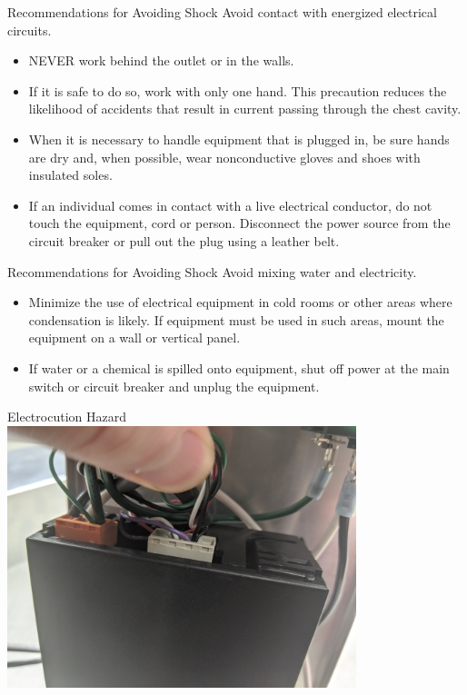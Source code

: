 \documentclass{presentation}
\begin{document}
\begin{frame}{Recommendations for Avoiding Shock}
  Avoid contact with energized electrical circuits.
  \begin{itemize}
    \item NEVER work behind the outlet or in the walls.
    \item If it is safe to do so, work with only one hand. This precaution reduces the likelihood of accidents that result in current passing through the chest cavity.
    \item When it is necessary to handle equipment that is plugged in, be sure hands are dry and, when possible, wear nonconductive gloves and shoes with insulated soles.
    \item If an individual comes in contact with a live electrical conductor, do not touch the equipment, cord or person. Disconnect the power source from the circuit breaker or pull out the plug using a leather belt.
  \end{itemize}
\end{frame}

\begin{frame}{Recommendations for Avoiding Shock}
  Avoid mixing water and electricity.
  \begin{itemize}
    \item Minimize the use of electrical equipment in cold rooms or other areas where condensation is likely. If equipment must be used in such areas, mount the equipment on a wall or vertical panel.
    \item If water or a chemical is spilled onto equipment, shut off power at the main switch or circuit breaker and unplug the equipment.
  \end{itemize}
\end{frame}

\begin{frame}{Electrocution Hazard}
  \centering
  \includegraphics[height=3in]{"./IMG_20200106_153053.jpg"}
\end{frame}
\end{document}
